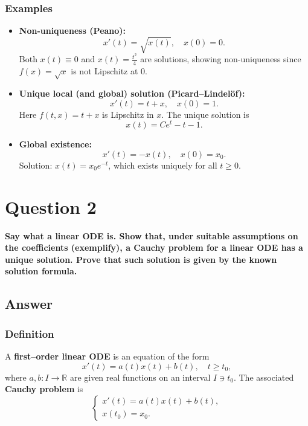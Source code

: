 \documentclass[12pt,a4paper]{book}
\theoremstyle{remark}
\newcommand{\RR}{\mathbb{R}}
\begin{document}
\subsubsection*{Examples}
\begin{itemize}
    \item \textbf{Non-uniqueness (Peano):} 
    \[
    x'(t) = \sqrt{x(t)}, \quad x(0)=0.
    \] 
    Both $x(t)\equiv 0$ and $x(t) = \tfrac{t^2}{4}$ are solutions, showing non-uniqueness since $f(x)=\sqrt{x}$ is not Lipschitz at $0$.

    \item \textbf{Unique local (and global) solution (Picard–Lindelöf):} 
    \[
    x'(t) = t+x, \quad x(0)=1.
    \]
    Here $f(t,x)=t+x$ is Lipschitz in $x$. The unique solution is
    \[
    x(t) = Ce^t - t - 1.
    \]

    \item \textbf{Global existence:} 
    \[
    x'(t) = -x(t), \quad x(0)=x_0.
    \]
    Solution: $x(t)=x_0e^{-t}$, which exists uniquely for all $t\geq 0$.
\end{itemize}













\newpage
\section{Question 2}
\textbf{Say what a linear ODE is. Show that, under suitable assumptions on the coefficients (exemplify), a Cauchy problem for a linear ODE has a unique solution. Prove that such solution is given by the known solution formula.}

\subsection*{Answer}

\subsubsection*{Definition}
A \textbf{first–order linear ODE} is an equation of the form
\[
x'(t) = a(t)x(t) + b(t), \quad t \ge t_0,
\]
where $a,b:I\to\RR$ are given real functions on an interval $I\ni t_0$. The associated \textbf{Cauchy problem} is
\[
\begin{cases}
x'(t) = a(t)x(t) + b(t),\\
x(t_0)=x_0.
\end{cases}
\]
\end{document}
